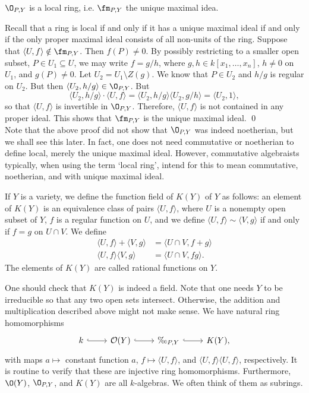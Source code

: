 \begin{prop}
$\O_{P,Y}$ is a local ring, i.e. $\fm_{P,Y}$ the unique maximal idea. 
\end{prop}

\pf Recall that a ring is local if and only if it has a unique maximal ideal if and only if the only proper maximal ideal consists of all non-units of the ring. Suppose that $\langle U,f \rangle \notin \fm_{P,Y}$. Then $f(P) \neq 0$. By possibly restricting to a smaller open subset, $P \in U_1 \subseteq U$, we may write $f= g/h$, where $g,h \in k[x_1,\ldots,x_n]$, $h \neq 0$ on $U_1$, and $g(P) \neq 0$. Let $U_2= U_1 \setminus Z(g)$. We know that $P \in U_2$ and $h/g$ is regular on $U_2$. But then $\langle U_2, h/g \rangle \in \O_{P,Y}$. But
	\[
	\langle U_2, h/g \rangle \cdot \langle U,f \rangle= \langle U_2, h/g \rangle \langle U_2, g/h \rangle= \langle U_2,1 \rangle,
	\]
so that $\langle U,f \rangle$ is invertible in $\O_{P,Y}$. Therefore, $\langle U,f \rangle$ is not contained in any proper ideal. This shows that $\fm_{P,Y}$ is the unique maximal ideal. \qed \\


Note that the above proof did not show that $\O_{P,Y}$ was indeed noetherian, but we shall see this later. In fact, one does not need commutative or noetherian to define local, merely the unique maximal ideal. However, commutative algebraists typically, when using the term `local ring', intend for this to mean commutative, noetherian, and with unique maximal ideal.


\begin{dfn}
If $Y$ is a variety, we define the function field of $K(Y)$ of $Y$ as follows: an element of $K(Y)$ is an equivalence class of pairs $\langle U,f \rangle$, where $U$ is a nonempty open subset of $Y$, $f$ is a regular function on $U$, and we define $\langle U,f \rangle \sim \langle V,g \rangle$ if and only if $f=g$ on $U \cap V$. We define
	\[
	\begin{split}
	\langle U,f \rangle + \langle V,g \rangle&= \langle U \cap V, f+g \rangle \\
	\langle U, f \rangle \langle V,g \rangle&= \langle U \cap V, fg \rangle.
	\end{split}
	\]
The elements of $K(Y)$ are called rational functions on $Y$.
\end{dfn}


One should check that $K(Y)$ is indeed a field. Note that one needs $Y$ to be irreducible so that any two open sets intersect. Otherwise, the addition and multiplication described above might not make sense. We have natural ring homomorphisms 
	\[
	\begin{tikzcd}
	k \arrow[hook]{r} & \mathcal{O}(Y) \arrow[hook]{r} & \O_{P,Y} \arrow[hook]{r} & K(Y),
	\end{tikzcd}
	\]
with maps $a \mapsto$ constant function $a$, $f \mapsto \langle U, f \rangle$, and $\langle U,f \rangle \langle U,f \rangle$, respectively. It is routine to verify that these are injective ring homomorphisms. Furthermore, $\O(Y)$, $\O_{P,Y}$, and $K(Y)$ are all $k$-algebras. We often think of them as subrings. 


